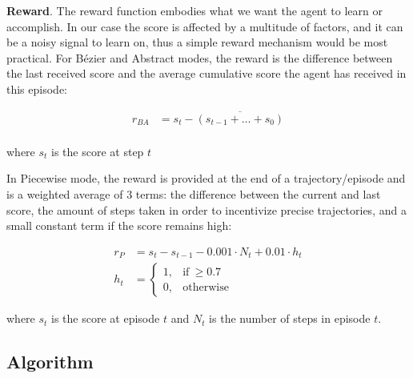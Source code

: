 \textbf{Reward}. The reward function embodies what we want the agent to learn or accomplish.
In our case the score is affected by a multitude of factors, and it can be a noisy signal to learn on, thus a simple reward mechanism would be most practical.
For Bézier and Abstract modes, the reward is the difference between the last received score and the average cumulative score the agent has received in this episode:

\begin{equation}
\begin{aligned}
    r_{BA} &= s_t-\overline{(s_{t-1}+\dots+s_0)}\\
\end{aligned}
\label{eqn:reward}
\end{equation}

where $s_t$ is the score at step $t$

In Piecewise mode, the reward is provided at the end of a trajectory/episode and is a weighted average of 3 terms: the difference between the current and last score, the amount of steps taken in order to incentivize precise trajectories, and a small constant term if the score remains high:

\begin{equation}
\begin{aligned}
    r_P &= s_t-s_{t-1} - 0.001\cdot N_t + 0.01\cdot h_t\\
    h_t &=
    \begin{cases}
      1, & \text{if}\ \geq 0.7\\
      0, & \text{otherwise}
    \end{cases}
\end{aligned}
\label{eqn:rewre}
\end{equation}

where $s_t$ is the score at episode $t$ and $N_t$ is the number of steps in episode $t$.

\subsection{Algorithm}

